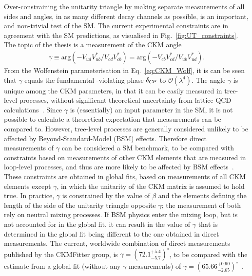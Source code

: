 Over-constraining the unitarity triangle by making separate measurements of all sides and angles, in as many different decay channels as possible, is an important, and non-trivial test of the SM. The current experimental constraints are in agreement with the SM predictions, as visualised in Fig.~\ref{fig:UT_constraints}. 
The topic of the thesis is a measurement of the CKM angle
\begin{align}\label{eq:gamma_definition}
    \gamma \equiv \mathrm{arg} (-V_{ud}^{\phantom{*}}V_{ub}^*/V_{cd}^{\phantom{*}}V_{cb}^*)
    = \mathrm{arg} (-V_{cb}^{\phantom{*}}V_{cd}^*/V_{ub}^{\phantom{*}}V_{ud}^*).
\end{align}
From the Wolfenstein parameterisation in Eq.~\eqref{eq:CKM_Wolf}, it is can be seen that $\gamma$ equals the fundamental \CP-violating phase $\delta_{C\!P}$ to $\mathcal O(\lambda^4)$. The angle $\gamma$ is unique among the CKM parameters, in that it can be easily measured in tree-level processes, without significant theoretical uncertainty from lattice QCD calculations~\cite{brodUltimateTheoreticalError2014}. Since $\gamma$ is (essentially) an input parameter in the SM, it is not possible to calculate a theoretical expectation that measurements can be compared to. However, tree-level processes are generally considered unlikely to be affected by Beyond-Standard-Model (BSM) effects. Therefore direct measurements of $\gamma$ can be considered a SM benchmark, to be compared with constraints based on measurements of other CKM elements that are measured in loop-level processes, and thus are more likely to be affected by BSM effects~\cite{blankeEmergingDeltaAnomaly2019}. These constraints are obtained in global fits, based on measurements of all CKM elements except $\gamma$, in which the unitarity of the CKM matrix is assumed to hold true. In practice, $\gamma$ is constrained by the value of $\beta$ and the elements defining the length of the side of the unitarity triangle opposite $\gamma$; the measurement of both rely on neutral \B mixing processes. If BSM physics enter the mixing loop, but is not accounted for in the global fit, it can result in the value of $\gamma$ that is determined in the global fit being different to the one obtained in direct measurements.
The current, worldwide combination of direct measurements published by the CKMFitter group, is $\gamma = (72.1^{+5.4}_{-5.7})^\circ $, to be compared with the estimate from a global fit (without any $\gamma$ measurements) of $\gamma = (65.66^{+0.90}_{-2.65})^\circ $~\cite{CKMfitter2015}. 
